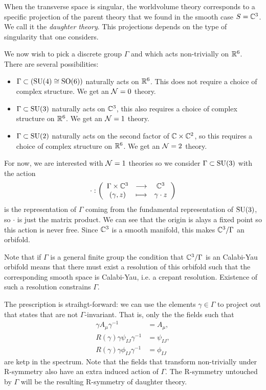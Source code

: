 \documentclass[a4paper,11pt]{article}
\begin{document}
    When the transverse space is singular, the worldvolume theory corresponds to a specific projection of the parent theory that we found in the smooth case $S=\mathbb{C}^3$. We call it the \emph{daughter theory}. This projections depends on the type of singularity that one considers.

    We now wish to pick a discrete group $\Gamma$ and which acts non-trivially on $\mathbb{R}^6$. There are several possibilities:
    \begin{itemize}
        \item $\Gamma\subset(\text{SU}(4)\cong\text{SO}(6))$ naturally acts on $\mathbb{R}^6$. This does not require a choice of complex structure. We get an $\mathcal{N}=0$ theory.
        \item $\Gamma\subset\text{SU}(3)$ naturally acts on $\mathbb{C}^3$, this also requires a choice of complex structure on $\mathbb{R}^6$. We get an $\mathcal{N}=1$ theory.
        \item $\Gamma\subset\text{SU}(2)$ naturally acts on the second factor of $\mathbb{C}\times\mathbb{C}^2$, so this requires a choice of complex structure on $\mathbb{R}^6$. We get an $\mathcal{N}=2$ theory.
    \end{itemize}

    For now, we are interested with $\mathcal{N}=1$ theories so we consider $\Gamma\subset\text{SU}(3)$ with the action
    \begin{equation}
        \cdot:\left(
        \begin{array}{ccc}
            \Gamma\times\mathbb{C}^3 & \longrightarrow & \mathbb{C}^3 \\
            (\gamma,z) & \longmapsto & \gamma\cdot z
        \end{array}
        \right)
    \end{equation}
    is the representation of $\Gamma$ coming from the fundamental representation of $\text{SU}(3)$, so $\cdot$ is just the matrix product. We can see that the origin is alays a fixed point so this action is never free. Since $\mathbb{C}^3$ is a smooth manifold, this makes $\mathbb{C}^3/\Gamma$ an orbifold.

    Note that if $\Gamma$ is a general finite group the condition that $\mathbb{C}^3/\Gamma$ is an Calabi-Yau orbifold means that there must exist a resolution of this orbifold such that the corresponding smooth space is Calabi-Yau, i.e. a crepant resolution. Existence of such a resolution constrains $\Gamma$\marker.

    The prescription is straihgt-forward: we can use the elements $\gamma\in\Gamma$ to project out that states that are not $\Gamma$-invariant. That is, only the the fields such that
    \begin{align}
        \gamma A_\mu \gamma^{-1} &= A_\mu,\label{eq:proj1}\\
        R(\gamma)\gamma \psi_{IJ} \gamma^{-1} &= \psi_{IJ}\label{eq:proj2},\\
        R(\gamma)\gamma \phi_{IJ} \gamma^{-1} &= \phi_{IJ}\label{eq:proj3}
    \end{align}
    are ketp in the spectrum. Note that the fields that transform non-trivially under R-symmetry also have an extra induced action of $\Gamma$. The R-symmetry untouched by $\Gamma$ will be the resulting R-symmetry of daughter theory.
\end{document}
